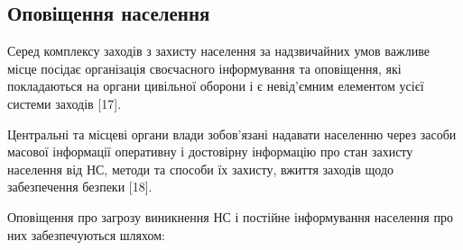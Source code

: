 \vspace{1.5em}

\subsection{Оповіщення населення}

Серед комплексу заходів з захисту населення за надзвичайних умов важливе місце посідає організація своєчасного інформування та оповіщення, які покладаються на органи цивільної оборони і є невід’ємним елементом усієї системи заходів [17].

Центральні та місцеві органи влади зобов’язані надавати населенню через засоби масової інформації оперативну і достовірну інформацію про стан захисту населення від НС, методи та способи їх захисту, вжиття заходів щодо забезпечення безпеки [18].

Оповіщення про загрозу виникнення НС і постійне інформування населення про них забезпечуються шляхом:

